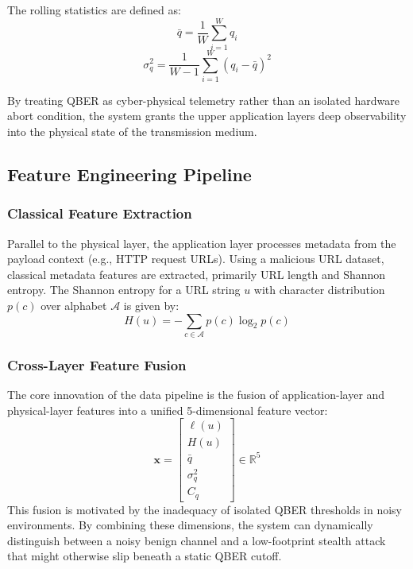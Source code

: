 The rolling statistics are defined as:
\begin{equation}
\bar{q} = \frac{1}{W} \sum_{i=1}^{W} q_i
\end{equation}
\begin{equation}
\sigma_q^2 = \frac{1}{W-1} \sum_{i=1}^{W} (q_i - \bar{q})^2
\end{equation}

By treating QBER as cyber-physical telemetry rather than an isolated hardware abort condition, the system grants the upper application layers deep observability into the physical state of the transmission medium.

\subsection{Feature Engineering Pipeline}

\subsubsection{Classical Feature Extraction}
Parallel to the physical layer, the application layer processes metadata from the payload context (e.g., HTTP request URLs). Using a malicious URL dataset, classical metadata features are extracted, primarily URL length and Shannon entropy. 
The Shannon entropy for a URL string $u$ with character distribution $p(c)$ over alphabet $\mathcal{A}$ is given by:
\begin{equation}
H(u) = -\sum_{c \in \mathcal{A}} p(c) \log_2 p(c)
\end{equation}

\subsubsection{Cross-Layer Feature Fusion}
The core innovation of the data pipeline is the fusion of application-layer and physical-layer features into a unified 5-dimensional feature vector:
\begin{equation}
\mathbf{x} = \begin{bmatrix} \ell(u) \\ H(u) \\ \bar{q} \\ \sigma_q^2 \\ C_q \end{bmatrix} \in \mathbb{R}^5
\end{equation}
This fusion is motivated by the inadequacy of isolated QBER thresholds in noisy environments. By combining these dimensions, the system can dynamically distinguish between a noisy benign channel and a low-footprint stealth attack that might otherwise slip beneath a static QBER cutoff.

